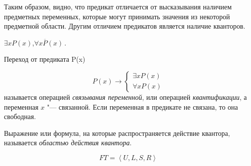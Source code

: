 Таким образом, видно, что предикат отличается от высказывания наличием
предметных переменных, которые могут принимать значения из некоторой
предметной области. Другим отличием предикатов является наличие
кванторов.

\begin{ex} $\exists x P(x)$,\quad $\forall x \overline{P}(x)$\,.
\end{ex}

\begin{defin} Переход от предиката P(x)
  
  $$
  P(x) \rightarrow
  \begin{cases} \exists x P(x)\\ \forall x P(x)
  \end{cases}
  $$
  называется операцией \emph{связывания переменной}, или операцией
\emph{квантификации}, а переменная $x$ "--- связанной. Если переменная
в предикате не связана, то она свободная.
\end{defin}

\begin{defin} Выражение или формула, на которые распространяется
действие квантора, называется \emph{областью действия квантора}.
\end{defin}

$$FT = \left<U,L,S,R\right>$$

